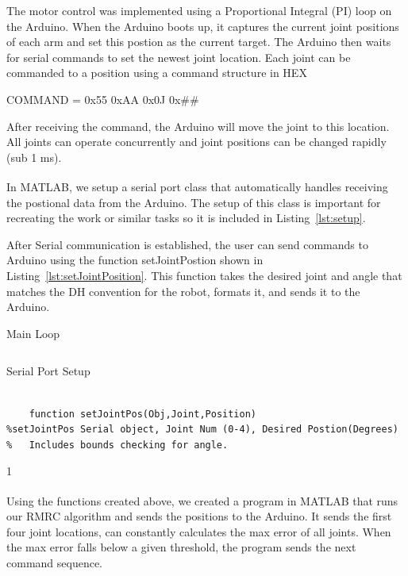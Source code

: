 \documentclass[paper=letter, fontsize=10pt]{scrartcl}	%
\numberwithin{equation}{section}															%
\numberwithin{figure}{section}																%
\numberwithin{table}{section}																%
\begin{document}
The motor control was implemented using a Proportional Integral (PI) loop on the Arduino. When the Arduino boots up, it captures the current joint positions of each arm and set this postion as the current target. The Arduino then waits for serial commands to set the newest joint location. Each joint can be commanded to a position using a command structure in HEX
\begin{center}
COMMAND = 0x55 0xAA 0x0J 0x\#\#
\end{center}

After receiving the command, the Arduino will move the joint to this location. All joints can operate concurrently and joint positions can be changed rapidly (sub 1 ms).

In MATLAB\textsuperscript{\textregistered}, we setup a serial port class that automatically handles receiving the postional data from the Arduino. The setup of this class is important for recreating the work or similar tasks so it is included in Listing~\ref{lst:setup}.

After Serial communication is established, the user can send commands to Arduino using the function setJointPostion shown in Listing~\ref{lst:setJointPosition}. This function takes the desired joint and angle that matches the DH convention for the robot, formats it, and sends it to the Arduino.
	 
	 \begin{listing}%
        \caption{Main Loop}    
        \inputminted[linenos=true,frame=lines]{matlab}{src/SerialSetup.m}    
        \label{lst:setup}    
    \end{listing}


	\begin{listing}%
    \caption{Serial Port Setup} 
    \begin{verbatim}
    
    function setJointPos(Obj,Joint,Position)
%setJointPos Serial object, Joint Num (0-4), Desired Postion(Degrees)
%   Includes bounds checking for angle. 

	\end{verbatim}
	\label{lst:setJointPosition}1
	\end{listing}

Using the functions created above, we created a program in MATLAB\textsuperscript{\textregistered} that runs our RMRC algorithm and sends the positions to the Arduino. It sends the first four joint locations, can constantly calculates the max error of all joints. When the max error falls below a given threshold, the program sends the next command sequence. 
	
\end{document}
